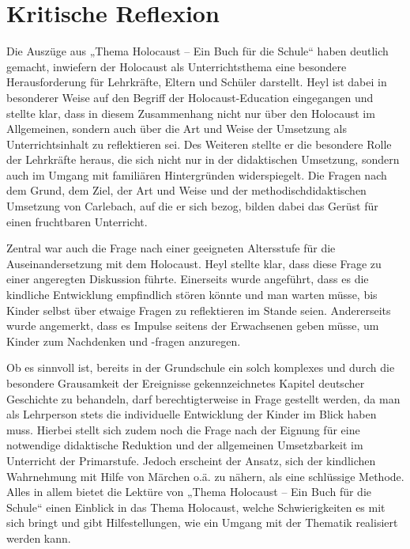 \section{Kritische Reflexion}
Die Auszüge aus „Thema Holocaust – Ein Buch für die Schule“ haben deutlich gemacht, inwiefern der Holocaust als Unterrichtsthema eine besondere Herausforderung für Lehrkräfte, Eltern und Schüler darstellt.
Heyl ist dabei in besonderer Weise auf den Begriff der Holocaust-Education eingegangen und stellte klar, dass in diesem Zusammenhang nicht nur über den Holocaust im Allgemeinen, sondern auch über die Art und Weise der Umsetzung als Unterrichtsinhalt zu reflektieren sei.
Des Weiteren stellte er die besondere Rolle der Lehrkräfte heraus, die sich nicht nur in der didaktischen Umsetzung, sondern auch im Umgang mit familiären Hintergründen widerspiegelt.
Die Fragen nach dem Grund, dem Ziel, der Art und Weise und der methodischdidaktischen Umsetzung von Carlebach, auf die er sich bezog, bilden dabei das Gerüst für einen fruchtbaren Unterricht.

Zentral war auch die Frage nach einer geeigneten Altersstufe für die Auseinandersetzung mit dem Holocaust.
Heyl stellte klar, dass diese Frage zu einer angeregten Diskussion führte.
Einerseits wurde angeführt, dass es die kindliche Entwicklung empfindlich stören könnte und man warten müsse, bis Kinder selbst über etwaige Fragen zu reflektieren im Stande seien.
Andererseits wurde angemerkt, dass es Impulse seitens der Erwachsenen geben müsse, um Kinder zum Nachdenken und -fragen anzuregen.

Ob es sinnvoll ist, bereits in der Grundschule ein solch komplexes und durch die besondere Grausamkeit der Ereignisse gekennzeichnetes Kapitel deutscher Geschichte zu behandeln, darf berechtigterweise in Frage gestellt werden, da man als Lehrperson stets die individuelle Entwicklung der Kinder im Blick haben muss.
Hierbei stellt sich zudem noch die Frage nach der Eignung für eine notwendige didaktische Reduktion und der allgemeinen Umsetzbarkeit im Unterricht der Primarstufe.
Jedoch erscheint der Ansatz, sich der kindlichen Wahrnehmung mit Hilfe von Märchen o.ä.
zu nähern, als eine schlüssige Methode.
Alles in allem bietet die Lektüre von „Thema Holocaust – Ein Buch für die Schule“ einen Einblick in das Thema Holocaust, welche Schwierigkeiten es mit sich bringt und gibt Hilfestellungen, wie ein Umgang mit der Thematik realisiert werden kann.
